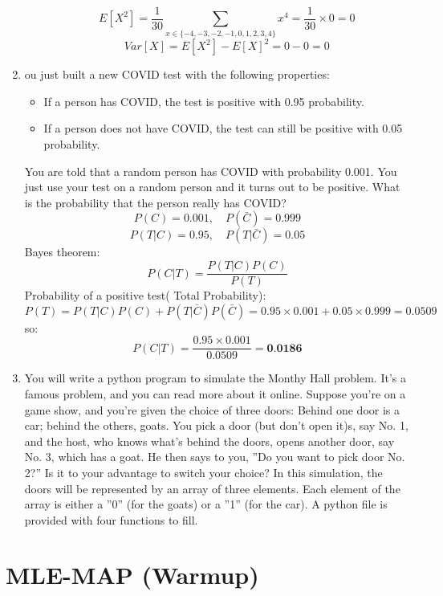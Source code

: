 \documentclass[a3paper,12pt]{extarticle} %
\begin{document}
\begin{enumerate}
\begin{enumerate}
\[        \]
        \[
            E[X^2] = \frac{1}{30} \sum_{x \in \{-4, -3, -2, -1, 0, 1, 2, 3, 4\}} x^4 = \frac{1}{30} \times 0 = 0
        \]
        \[
            Var[X] = E[X^2] - E[X]^2 = 0 - 0 = 0
        \]
    \end{enumerate}
    \item ou just built a new COVID test with the following properties:
    \begin{itemize}
        \item If a person has COVID, the test is positive with  0.95 probability.
        \item If a person does not have COVID, the test can still be positive with 0.05 probability.
    \end{itemize}
    You are told that a random person has COVID with probability 0.001. You just use your test on a random person and it turns out to be positive. What is the probability that the person really has COVID?
    \[
        P(C) = 0.001, \quad P(\bar{C}) = 0.999
    \]
    \[
        P(T | C) = 0.95, \quad P(T | \bar{C}) = 0.05
    \]
    Bayes theorem:
    \[
        P(C | T) = \frac{P(T | C)P(C)}{P(T)}
    \]
    Probability of a positive test( Total Probability):
    \[
        P(T) = P(T | C)P(C) + P(T | \bar{C})P(\bar{C}) = 0.95 \times 0.001 + 0.05 \times 0.999 = 0.0509
    \]
    so:
    \[
        P(C | T) = \frac{0.95 \times 0.001}{0.0509} = \textbf{0.0186}
    \]
    \item You will write a python program to simulate the Monthy Hall problem. It’s a famous problem, and you can read more about it online. Suppose you’re on a game show, and you’re given the choice of three doors: Behind one door is a car; behind the others, goats. You pick a door (but don’t open it)s, say No. 1, and the host, who knows what’s behind the doors, opens another door, say No. 3, which has a goat. He then says to you, ”Do
    you want to pick door No. 2?” Is it to your advantage to switch your choice? In this simulation, the doors will be represented by an array of three elements. Each element of the
    array is either a ”0” (for the goats) or a ”1” (for the car). A python file is provided with four functions to fill.
\end{enumerate}

\newpage
\section{MLE-MAP (Warmup)}
\end{document}
